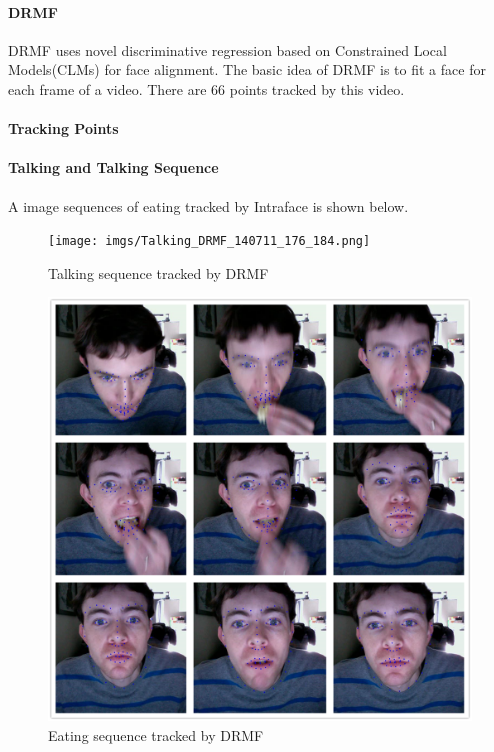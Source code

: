 \paragraph{DRMF}
DRMF uses novel discriminative regression based on Constrained Local Models(CLMs) for face alignment. The basic idea of DRMF is to fit a face for each frame of a video. There are 66 points tracked by this video.
\newline
\paragraph{Tracking Points}
\paragraph{Talking and Talking Sequence}
A image sequences of eating tracked by Intraface is shown below.
\begin{figure}[h!]
\centering
\texttt{[image: imgs/Talking\_DRMF\_140711\_176\_184.png]}
\caption{Talking sequence tracked by DRMF}
\end{figure}
\begin{figure}[h!]
\centering
\includegraphics[width=130mm]{imgs/Tracking_DRMF_eating.png}
\caption{Eating sequence tracked by DRMF}
\end{figure}

